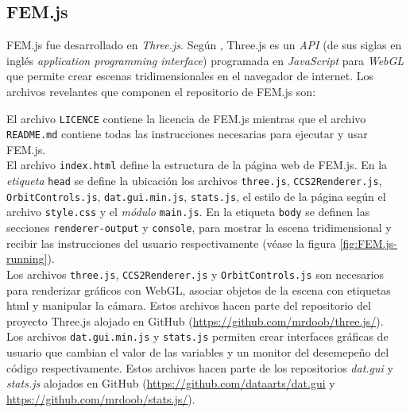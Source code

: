 \subsection{FEM.js}

FEM.js fue desarrollado en \emph{Three.js}. Según \cite{dirksen2015threejs}, Three.js es un \emph{API} (de sus siglas en inglés \emph{application programming interface}) programada en \emph{JavaScript} para \emph{WebGL} que permite crear escenas tridimensionales en el navegador de internet. Los archivos revelantes que componen el repositorio de FEM.js son:
\bigskip

  
\bigskip

El archivo \verb|LICENCE| contiene la licencia de FEM.js mientras que el archivo \verb|README.md| contiene todas las instrucciones necesarias para ejecutar y usar FEM.js.\\

El archivo \verb|index.html| define la estructura de la página web de FEM.js. En la \emph{etiqueta} \verb|head| se define la ubicación los archivos \verb|three.js|, \verb|CCS2Renderer.js|, \verb|OrbitControls.js|, \verb|dat.gui.min.js|, \verb|stats.js|, el estilo de la página según el archivo \verb|style.css| y el \emph{módulo} \verb|main.js|. En la etiqueta \verb|body| se definen las secciones \verb|renderer-output| y \verb|console|, para mostrar la escena tridimensional y recibir las instrucciones del usuario respectivamente (véase la figura \ref{fig:FEM.js-running}).\\

Los archivos \verb|three.js|, \verb|CCS2Renderer.js| y \verb|OrbitControls.js| son necesarios para renderizar gráficos con WebGL, asociar objetos de la escena con etiquetas html y manipular la cámara. Estos archivos hacen parte del repositorio del proyecto Three.js alojado en GitHub (\url{https://github.com/mrdoob/three.js/}).\\

Los archivos \verb|dat.gui.min.js| y \verb|stats.js| permiten crear interfaces gráficas de usuario que cambian el valor de las variables y un monitor del desemepeño del código respectivamente. Estos archivos hacen parte de los repositorios \emph{dat.gui} y \emph{stats.js} alojados en GitHub (\url{https://github.com/dataarts/dat.gui} y \url{https://github.com/mrdoob/stats.js/}).\\

